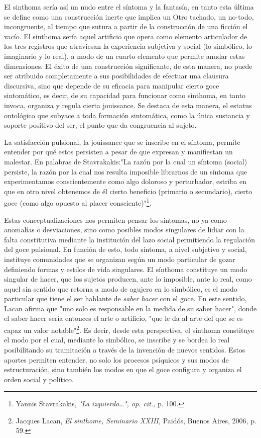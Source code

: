 \documentclass{book}
\begin{document}
El sinthoma sería así un nudo entre el síntoma y la fantasía, en tanto
esta última se define como una construcción inerte que implica un Otro
tachado, un no-todo, incongruente, al tiempo que sutura a partir de la
construcción de una ficción el vacío. El sinthoma sería aquel artificio
que opera como elemento articulador de los tres registros que atraviesan
la experiencia subjetiva y social (lo simbólico, lo imaginario y lo
real), a modo de un cuarto elemento que permite anudar estas
dimensiones. El éxito de una construcción significante, de esta manera,
no puede ser atribuido completamente a sus posibilidades de efectuar una
clausura discursiva, sino que depende de su eficacia para manipular
cierto goce sintomático, es decir, de su capacidad para funcionar como
sinthoma, en tanto invoca, organiza y regula cierta jouissance. Se
destaca de esta manera, el estatus ontológico que subyace a toda
formación sintomática, como la única sustancia y soporte positivo del
ser, el punto que da congruencia al sujeto.

La satisfacción pulsional, la jouissance que se inscribe en el síntoma,
permite entender por qué estos persisten a pesar de que expresan y
manifiestan un malestar. En palabras de Stavrakakis:"La razón por la
cual un síntoma (social) persiste, la razón por la cual nos resulta
imposible librarnos de un síntoma que experimentamos conscientemente
como algo doloroso y perturbador, estriba en que en otro nivel obtenemos
de él cierto beneficio (primario o secundario), cierto goce (como algo
opuesto al placer consciente)"\footnote{Yannis Stavrakakis, \emph{"La
  izquierda\ldots", op. cit.,} p. 100.}.

Estas conceptualizaciones nos permiten pensar los síntomas, no ya como
anomalías o desviaciones, sino como posibles modos singulares de lidiar
con la falta constitutiva mediante la institución del lazo social
permitiendo la regulación del goce pulsional. En función de esto, todo
síntoma, a nivel subjetivo y social, instituye comunidades que se
organizan según un modo particular de gozar definiendo formas y estilos
de vida singulares. El sínthoma constituye un modo singular de hacer,
que los sujetos producen, ante lo imposible, ante lo real, como aquel
sin sentido que retorna a modo de agujero en lo simbólico, es el modo
particular que tiene el ser hablante de \emph{saber hacer} con el goce.
En este sentido, Lacan afirma que "uno solo es responsable en la medida
de su saber hacer", donde el saber hacer sería entonces el arte o
artificio, "que le da al arte del que se es capaz un valor
notable"\footnote{Jacques Lacan, \emph{El sinthome, Seminario XXIII,}
  Paidós, Buenos Aires, 2006, p. 59.}. Es decir, desde esta perspectiva,
el sínthoma constituye el modo por el cual, mediante lo simbólico, se
inscribe y se bordea lo real posibilitando su tramitación a través de la
invención de nuevos sentidos. Estos aportes permiten entender, no solo
los procesos psíquicos y sus modos de estructuración, sino también los
modos en que el goce configura y organiza el orden social y político.
\end{document}
